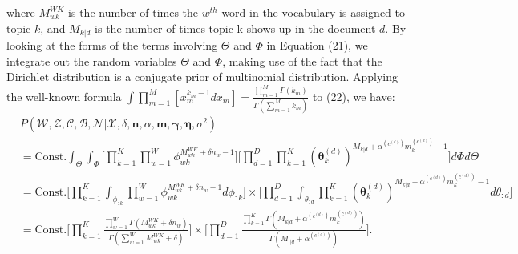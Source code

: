 \documentclass[a4paper]{article}
\begin{document}
where $M^{WK}_{wk}$ is the number of times the $w^{th}$ word in the vocabulary is assigned to topic $k$, and $M_{k|d}$ is the number of times topic k shows up in the document $d$. By looking at the forms of the terms involving  $\Theta$ and $\Phi$ in Equation (21), we integrate out the random variables $\Theta$ and $\Phi$, making use of the fact that the Dirichlet distribution is a conjugate prior of multinomial distribution. Applying the well-known formula $\int\prod_{m=1}^{M}[x_m^{k_m-1}dx_m]=\frac{\prod_{m=1}^M\Gamma(k_m)}{\Gamma(\sum_{m=1}^Mk_m)}$ to (22), we have:
\begin{equation}
\begin{aligned}
&P(\mathcal{W}, \mathcal{Z}, \mathcal{C}, \mathcal{B}, \mathcal{N}| \mathcal{X}, \delta, \boldsymbol{n}, \alpha, \boldsymbol{m}, \boldsymbol{\gamma}, \boldsymbol{\eta}, \sigma^2)\\&=\mbox{Const.}\int_{\Theta}\int_{\Phi}\Big[\prod_{k=1}^{K}\prod_{w=1}^{W}\phi_{wk}^{M^{WK}_{wk}+\delta n_w-1}\Big]\Big[\prod_{d=1}^{D}\prod_{k=1}^{K}(\boldsymbol{\theta}^{(d)}_{k})^{M_{k|d}+\alpha^{(c^{(d)})} m^{(c^{(d)})} _k-1}\Big]d\Phi d\Theta
\\&=\mbox{Const.}\Big[\prod_{k=1}^{K}\int_{\phi_{:k}}\prod_{w=1}^{W}\phi_{wk}^{M^{WK}_{wk}+\delta n_w-1  }d\phi_{:k}\Big]\times\Big[\prod_{d=1}^{D}\int_{\theta_{:d}}\prod_{k=1}^{K}(\boldsymbol{\theta}^{(d)}_{k})^{M_{k|d}+\alpha^{(c^{(d)})} m^{(c^{(d)})}_k-1}d\theta_{:d}\Big]
\\&=\mbox{Const.}\Big[\prod_{k=1}^{K}\frac{\prod_{w=1}^W\Gamma(M_{wk}^{WK}+\delta n_w)}{\Gamma(\sum_{w=1}^WM_{wk}^{WK}+\delta )}\Big]\times\Big[\prod_{d=1}^{D}\frac{\prod_{k=1}^K\Gamma(M_{k|d}+\alpha^{(c^{(d)})} m^{(c^{(d)})}_k)}{\Gamma(M_{\cdot|d}+\alpha^{(c^{(d)})})}\Big].
\end{aligned}
\end{equation}
\end{document}
